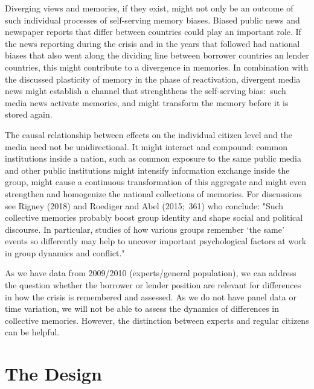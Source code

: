 \documentclass[12pt]{article}
\begin{document}
Diverging views and memories, if they exist, might not only be an outcome of
such individual processes of self-serving memory biases. Biased public news
and newspaper reports that differ between countries could play an important
role. If the news reporting during the crisis and in the years that followed
had national biases that also went along the dividing line between borrower
countries an lender countries, this might contribute to a divergence in
memories. In combination with the discussed plasticity of memory in the
phase of reactivation, divergent media news might establish a channel that
strenghthens the self-serving bias:\ such media news activate memories, and
might transform the memory before it is stored again. 

The causal relationship between effects on the individual citizen
level and the media need not be unidirectional. It might  interact and
compound: common institutions inside a nation, such as common exposure to
the same public media and other public institutions might intensify
information exchange inside the group, might cause a continuous
transformation of this aggregate and might even strengthen and homogenize
the national collections of memories. For discussions see Rigney (2018) and
Roediger and Abel (2015;\ 361) who conclude: "Such collective memories
probably boost group identity and shape social and political discourse. In
particular, studies of how various groups remember `the same' events so
differently may help to uncover important psychological factors at work in
group dynamics and conflict." 

As we have data from 2009/2010 (experts/general population), we can address
the question whether the borrower or lender position are relevant for
differences in how the crisis is remembered and assessed. As we do not have
panel data or time variation, we will not be able to assess the dynamics of
differences in collective memories. However, the distinction between experts
and regular citizens can be helpful. 
\section{The Design}
\end{document}

